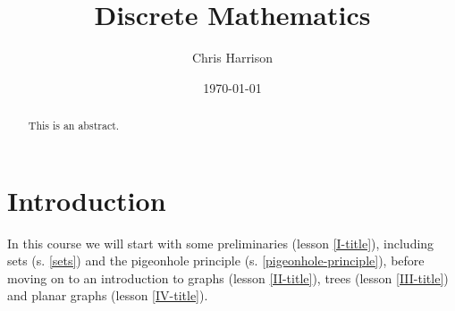 \documentclass[11pt,a4paper]{article}
\title{Discrete Mathematics}
\author{Chris Harrison}
\date{\today}
\begin{document}
\maketitle 

\begin{abstract}
This is an abstract. 
\end{abstract}

\section*{Introduction}

In this course we will start with some preliminaries (lesson \ref{I-title}), 
including sets (s. \ref{sets}) and the pigeonhole 
principle (s. \ref{pigeonhole-principle}), 
before moving on to an introduction to graphs (lesson \ref{II-title}), 
trees (lesson \ref{III-title}) and planar graphs (lesson \ref{IV-title}).







\end{document}
